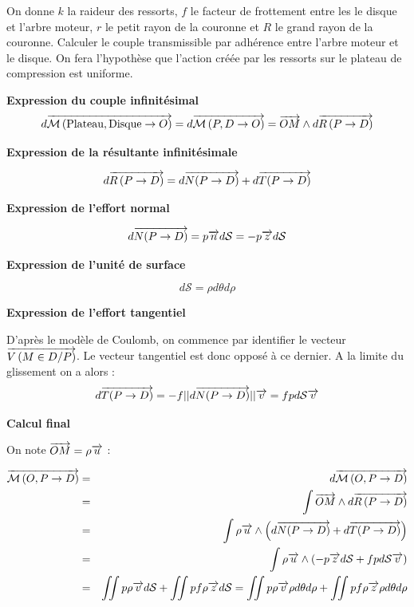 \documentclass[10pt]{article}
\begin{document}
\begin{exemple}
On donne $k$ la raideur des ressorts, $f$ le facteur de frottement entre les le disque et l'arbre moteur, $r$ le petit rayon de la couronne et $R$ le grand rayon de la couronne. Calculer le couple transmissible par adhérence entre l'arbre moteur et le disque. On fera l'hypothèse que l'action créée par les ressorts sur le plateau de compression est uniforme. 

\textbf{Expression du couple infinitésimal}
$$
d\overrightarrow{\mathcal{M}\left( {\text{Plateau}}, {\text{Disque}} \rightarrow {O}\right)} =
d\overrightarrow{\mathcal{M}\left( {P}, {D} \rightarrow {O}\right)} =  \overrightarrow{OM}\wedge d\overrightarrow{R\left( {P} \rightarrow {D}\right)}
$$

\textbf{Expression de la résultante infinitésimale}

$$
d\overrightarrow{R\left( {P} \rightarrow {D}\right)} = d\overrightarrow{N(P\rightarrow D)}+d\overrightarrow{T(P\rightarrow D)}
$$

\textbf{Expression de l'effort normal}

$$
d\overrightarrow{N(P\rightarrow D)} = p \overrightarrow{n} d\mathcal{S} = -p \overrightarrow{z} d\mathcal{S}
$$

\textbf{Expression de l'unité de surface}

$$
d\mathcal{S} = \rho d\theta d\rho
$$

\textbf{Expression de l'effort tangentiel}

D'après le modèle de Coulomb, on commence par identifier le vecteur $\overrightarrow{V\left( {M} \in {D}/{P}\right)}$.
Le vecteur tangentiel est donc opposé à ce dernier. A la limite du glissement on a alors : 
$$
d\overrightarrow{T(P\rightarrow D)} = -f ||d\overrightarrow{N(P\rightarrow D)}|| \overrightarrow{v}    = fp d\mathcal{S}\overrightarrow{v}
$$

\textbf{Calcul final}

On note $\overrightarrow{OM}=\rho\overrightarrow{u}$ :

\begin{eqnarray*}
\overrightarrow{\mathcal{M}\left( {O}, {P} \rightarrow {D}\right)}  
&=& d\overrightarrow{\mathcal{M}\left( {O}, {P} \rightarrow {D}\right)}  \\
&=& \int \overrightarrow{OM}\wedge d\overrightarrow{R\left( {P} \rightarrow {D}\right)} \\
&=& \int \rho\overrightarrow{u} \wedge \left( d\overrightarrow{N(P\rightarrow D)}+d\overrightarrow{T(P\rightarrow D)} \right)\\
&=& \int \rho\overrightarrow{u} \wedge \left( -p \overrightarrow{z} d\mathcal{S} +fp d\mathcal{S}\overrightarrow{v} \right)\\
&=& \iint p\rho\overrightarrow{v} d\mathcal{S} +\iint pf\rho  \overrightarrow{z}d\mathcal{S} = 
\iint p\rho\overrightarrow{v} \rho d\theta d\rho +\iint pf\rho  \overrightarrow{z}\rho d\theta d\rho \\
\end{eqnarray*}


\end{exemple}
\end{document}
